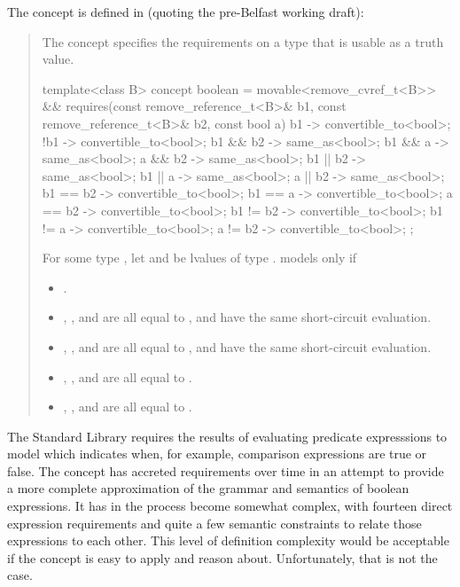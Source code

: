 The  concept is defined in  (quoting the pre-Belfast
working draft):

\begin{quote}
\pnum
The  concept specifies the requirements on a type that is usable as a truth
value.

\begin{codeblock}
template<class B>
  concept boolean =
    movable<remove_cvref_t<B>> &&
    requires(const remove_reference_t<B>& b1,
             const remove_reference_t<B>& b2, const bool a) {
      { b1 } -> convertible_to<bool>;
      { !b1 } -> convertible_to<bool>;
      { b1 && b2 } -> same_as<bool>;
      { b1 &&  a } -> same_as<bool>;
      {  a && b2 } -> same_as<bool>;
      { b1 || b2 } -> same_as<bool>;
      { b1 ||  a } -> same_as<bool>;
      {  a || b2 } -> same_as<bool>;
      { b1 == b2 } -> convertible_to<bool>;
      { b1 ==  a } -> convertible_to<bool>;
      {  a == b2 } -> convertible_to<bool>;
      { b1 != b2 } -> convertible_to<bool>;
      { b1 !=  a } -> convertible_to<bool>;
      {  a != b2 } -> convertible_to<bool>;
    };
\end{codeblock}

\pnum
For some type , let  and  be lvalues of type
.  models  only if
\begin{itemize}
\item {}.
\item {}, , and  are all equal
  to , and have the same short-circuit evaluation.
\item {}, , and  are all equal to
  , and have the same short-circuit evaluation.
\item {}, , and  are all
  equal to .
\item {}, , and  are all
  equal to .
\end{itemize}
\end{quote}

The Standard Library requires the results of evaluating predicate expresssions to model
 which indicates when, for example, comparison expressions are true or false.
The concept has accreted requirements over time in an attempt to provide a more complete
approximation of the grammar and semantics of boolean expressions. It has in the process become
somewhat complex, with fourteen direct expression requirements and quite a few semantic constraints
to relate those expressions to each other. This level of definition complexity would be acceptable
if the concept is easy to apply and reason about. Unfortunately, that is not the case.

